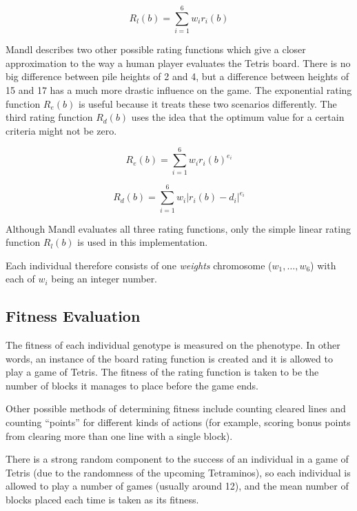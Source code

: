 \documentclass[a4paper,12pt]{article}
\begin{document}
\begin{equation}
  R_l(b) = \sum^6_{i=1} w_ir_i(b)
\end{equation}

Mandl describes two other possible rating functions which give a closer
approximation to the way a human player evaluates the Tetris board.
There is no big difference between pile heights of 2 and 4, but a difference
between heights of 15 and 17 has a much more drastic influence on the game.
The exponential rating function $R_e(b)$ is useful because it treats these two
scenarios differently.
The third rating function $R_d(b)$ uses the idea that the optimum value for a
certain criteria might not be zero.

\begin{equation}
  R_e(b) = \sum^6_{i=1} w_ir_i(b)^{e_i}
\end{equation}

\begin{equation}
  R_d(b) = \sum^6_{i=1} w_i \lvert r_i(b) - d_i \rvert ^{e_i}
\end{equation}

Although Mandl evaluates all three rating functions, only the simple linear
rating function $R_l(b)$ is used in this implementation.

Each individual therefore consists of one \emph{weights} chromosome
($w_1, \ldots, w_6$) with each of $w_i$ being an integer number.

\subsection{Fitness Evaluation}

The fitness of each individual genotype is measured on the phenotype.
In other words, an instance of the board rating function is created and it is
allowed to play a game of Tetris.
The fitness of the rating function is taken to be the number of blocks it
manages to place before the game ends.

Other possible methods of determining fitness include counting cleared lines
and counting ``points'' for different kinds of actions (for example, scoring
bonus points from clearing more than one line with a single block).

There is a strong random component to the success of an individual in a game of
Tetris (due to the randomness of the upcoming Tetraminos), so each individual
is allowed to play a number of games (usually around 12), and the mean number
of blocks placed each time is taken as its fitness.
\end{document}

